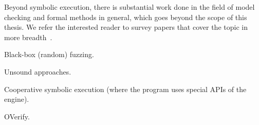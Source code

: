 Beyond symbolic execution, there is substantial work done in the field of model checking and formal methods in general, which goes beyond the scope of this thesis.  We refer the interested reader to survey papers that cover the topic in more breadth~\cite{jhala2009software, woodcock2009formal}.

Black-box (random) fuzzing.

Unsound approaches.

Cooperative symbolic execution (where the program uses special APIs of the engine).

OVerify.
\fi





